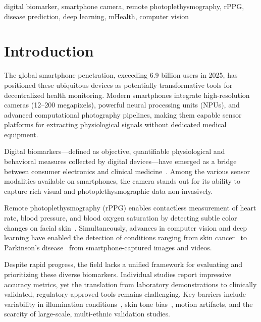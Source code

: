 \documentclass[conference]{IEEEtran}
\begin{document}
\begin{IEEEkeywords}
digital biomarker, smartphone camera, remote photoplethysmography, rPPG, disease prediction, deep learning, mHealth, computer vision
\end{IEEEkeywords}

\section{Introduction}

The global smartphone penetration, exceeding 6.9 billion users in 2025, has positioned these ubiquitous devices as potentially transformative tools for decentralized health monitoring. Modern smartphones integrate high-resolution cameras (12--200 megapixels), powerful neural processing units (NPUs), and advanced computational photography pipelines, making them capable sensor platforms for extracting physiological signals without dedicated medical equipment.

Digital biomarkers---defined as objective, quantifiable physiological and behavioral measures collected by digital devices---have emerged as a bridge between consumer electronics and clinical medicine~\cite{dawadi2025scoping}. Among the various sensor modalities available on smartphones, the camera stands out for its ability to capture rich visual and photoplethysmographic data non-invasively.

Remote photoplethysmography (rPPG) enables contactless measurement of heart rate, blood pressure, and blood oxygen saturation by detecting subtle color changes on facial skin~\cite{debnath2025comprehensive}. Simultaneously, advances in computer vision and deep learning have enabled the detection of conditions ranging from skin cancer~\cite{naqvi2023skincancer} to Parkinson's disease~\cite{multimodalpd2025} from smartphone-captured images and videos.

Despite rapid progress, the field lacks a unified framework for evaluating and prioritizing these diverse biomarkers. Individual studies report impressive accuracy metrics, yet the translation from laboratory demonstrations to clinically validated, regulatory-approved tools remains challenging. Key barriers include variability in illumination conditions~\cite{acharya2025reliability}, skin tone bias~\cite{fibricheck2025}, motion artifacts, and the scarcity of large-scale, multi-ethnic validation studies.
\end{document}

